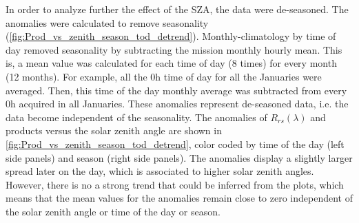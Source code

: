 \documentclass[onecolumn,3p,letterpaper,11pt]{elsarticle}
\begin{document}

In order to analyze further the effect of the SZA, the data were de-seasoned.
The anomalies were calculated to remove seasonality (\autoref{fig:Prod_vs_zenith_season_tod_detrend}). Monthly-climatology by time of day removed seasonality by subtracting the mission monthly hourly mean. This is, a mean value was calculated for each time of day (8 times) for every month (12 months). For example, all the 0h time of day for all the Januaries were averaged. Then, this time of the day monthly average was subtracted from every 0h acquired in all Januaries. These anomalies represent de-seasoned data, i.e. the data become independent of the seasonality. The anomalies of $R_{rs}(\lambda)$ and products versus the solar zenith angle are shown in \autoref{fig:Prod_vs_zenith_season_tod_detrend}, color coded by time of the day (left side panels) and season (right side panels). The anomalies display a slightly larger spread later on the day, which is associated to higher solar zenith angles. However, there is no a strong trend that could be inferred from the plots, which means that the mean values for the anomalies remain close to zero independent of the solar zenith angle or time of the day or season.
\end{document}
